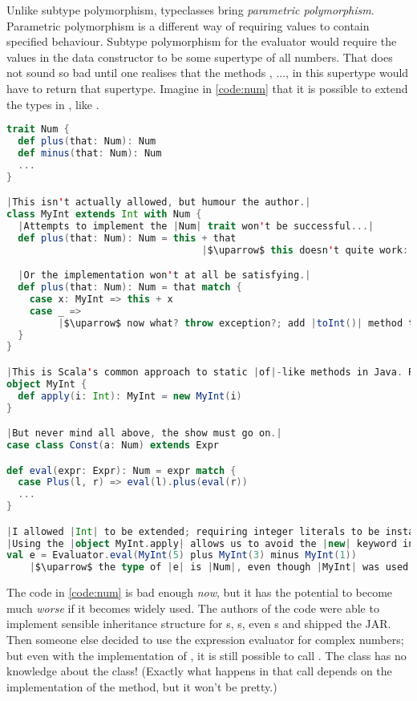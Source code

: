 \documentclass[10 pt]{article}
\begin{document}
Unlike subtype polymorphism, typeclasses bring \emph{parametric polymorphism}. Parametric polymorphism is a different way of requiring values to contain specified behaviour. Subtype polymorphism for the evaluator would require the values in the  data constructor to be some supertype of all numbers. That does not sound so bad until one realises that the methods , ...,  in this supertype would have to return that supertype. Imagine in \autoref{code:num} that it is possible to extend the types in , like .

\begin{lstlisting}[caption={Exploring the Num supertype}, label={code:num}, language=Scala, escapechar=|]
trait Num {
  def plus(that: Num): Num
  def minus(that: Num): Num
  ...
}

|This isn't actually allowed, but humour the author.|
class MyInt extends Int with Num {
  |Attempts to implement the |Num| trait won't be successful...|
  def plus(that: Num): Num = this + that 
                                  |$\uparrow$ this doesn't quite work: can't add |Int| and |Num|.|

  |Or the implementation won't at all be satisfying.|
  def plus(that: Num): Num = that match {
    case x: MyInt => this + x
    case _ => 
         |$\uparrow$ now what? throw exception?; add |toInt()| method to |Num|?|
  }
}

|This is Scala's common approach to static |of|-like methods in Java. Recall |Optional.of| and similar.|
object MyInt {
  def apply(i: Int): MyInt = new MyInt(i)
}

|But never mind all above, the show must go on.|
case class Const(a: Num) extends Expr

def eval(expr: Expr): Num = expr match {
  case Plus(l, r) => eval(l).plus(eval(r))
  ...
}

|I allowed |Int| to be extended; requiring integer literals to be instances of |MyInt| is too much!|
|Using the |object MyInt.apply| allows us to avoid the |new| keyword in this case.|
val e = Evaluator.eval(MyInt(5) plus MyInt(3) minus MyInt(1))
    |$\uparrow$ the type of |e| is |Num|, even though |MyInt| was used.|
\end{lstlisting}

The code in \autoref{code:num} is bad enough \emph{now}, but it has the potential to become much \emph{worse} if it becomes widely used. The authors of the code were able to implement sensible inheritance structure for s, s, even s and shipped the JAR. Then someone else decided to use the expression evaluator for complex numbers; but even with the implementation of , it is still possible to call . The class  has no knowledge about the  class! (Exactly what happens in that call depends on the implementation of the  method, but it won't be pretty.)
\end{document}
